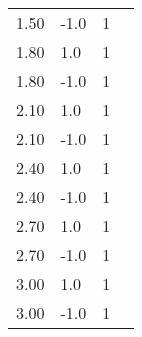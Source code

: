 \begin{table}[H]
\begin{minipage}[t]{.45\linewidth}
\begin{tabular}{@{}llll@{}}
1.50   & -1.0     & 1        \\
1.80   &  1.0     & 1        \\
1.80   & -1.0     & 1        \\
2.10   &  1.0     & 1        \\
2.10   & -1.0     & 1        \\
2.40   &  1.0     & 1        \\
2.40   & -1.0     & 1        \\
2.70   &  1.0     & 1        \\
2.70   & -1.0     & 1        \\
3.00   &  1.0     & 1        \\
3.00   & -1.0     & 1        \\ \bottomrule
\end{tabular}
\end{minipage}
\end{table}
